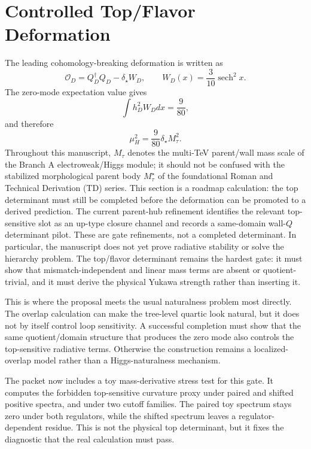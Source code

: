 \documentclass[11pt]{article}
\begin{document}
\section{Controlled Top/Flavor Deformation}
The leading cohomology-breaking deformation is written as
\begin{equation}
\mathcal{O}_D=Q_D^\dagger Q_D-\delta_\star W_D,\qquad W_D(x)=\frac3{10}\operatorname{sech}^2x .
\end{equation}
The zero-mode expectation value gives
\begin{equation}
\int h_D^2 W_D dx=\frac9{80},
\end{equation}
and therefore
\begin{equation}
\mu_H^2=\frac9{80}\delta_\star M_\tau^2 .
\end{equation}
Throughout this manuscript, $M_\tau$ denotes the multi-TeV parent/wall mass scale of the Branch A electroweak/Higgs module; it should not be confused with the stabilized morphological parent body $M_\tau^\star$ of the foundational Roman and Technical Derivation (TD) series. This section is a roadmap calculation: the top determinant must still be completed before the deformation can be promoted to a derived prediction. The current parent-hub refinement identifies the relevant top-sensitive slot as an up-type closure channel and records a same-domain wall-$Q$ determinant pilot. These are gate refinements, not a completed determinant. In particular, the manuscript does not yet prove radiative stability or solve the hierarchy problem. The top/flavor determinant remains the hardest gate: it must show that mismatch-independent and linear mass terms are absent or quotient-trivial, and it must derive the physical Yukawa strength rather than inserting it.

This is where the proposal meets the usual naturalness problem most directly.
The overlap calculation can make the tree-level quartic look natural, but it
does not by itself control loop sensitivity.  A successful completion must show
that the same quotient/domain structure that produces the zero mode also
controls the top-sensitive radiative terms.  Otherwise the construction remains
a localized-overlap model rather than a Higgs-naturalness mechanism.

The packet now includes a toy mass-derivative stress test for this gate.  It
computes the forbidden top-sensitive curvature proxy under paired and shifted
positive spectra, and under two cutoff families.  The paired toy spectrum
stays zero under both regulators, while the shifted spectrum leaves a
regulator-dependent residue.  This is not the physical top determinant, but it
fixes the diagnostic that the real calculation must pass.
\end{document}

